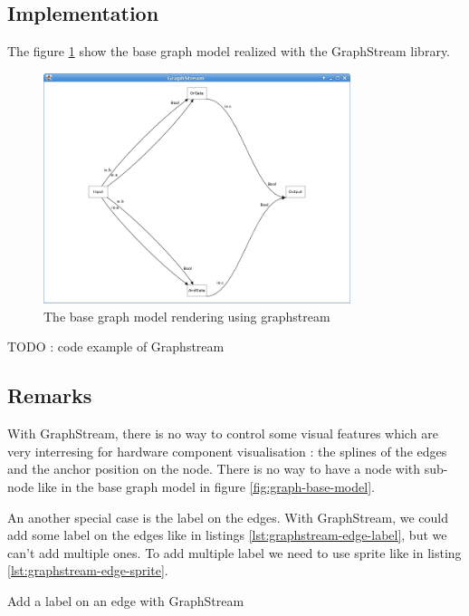 \subsection{Implementation} %
\label{sub:Implementation}

The figure \ref{fig:base-graph-model-graphstream} show the base graph model realized with the GraphStream library.

\begin{figure}[h]
    \centering
    \includegraphics[width=0.8\textwidth]{img/graphstream-base-model-example}
    \caption{The base graph model rendering using graphstream}
    \label{fig:base-graph-model-graphstream}
\end{figure}

TODO : code example of Graphstream


\subsection{Remarks} %
\label{sub:Remarks}

With GraphStream, there is no way to control some visual features which are very interresing for hardware component visualisation : the splines of the edges and the anchor position on the node. There is no way to have a node with sub-node like in the base graph model in figure \ref{fig:graph-base-model}.

An another special case is the label on the edges. With GraphStream, we could add some label on the edges like in listings \ref{lst:graphstream-edge-label}, but we can't add multiple ones. To add multiple label we need to use sprite like in listing \ref{lst:graphstream-edge-sprite}.

\begin{listing}[h] %
    \centering
    \caption{Add a label on an edge with GraphStream}
    \label{lst:graphstream-edge-label}
\end{listing} %

